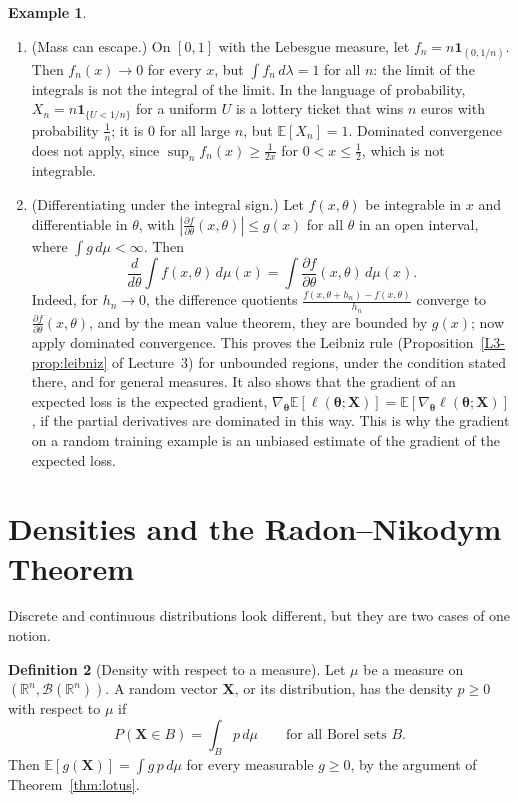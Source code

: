 \documentclass[11pt]{article}
\newcommand{\E}{\mathbb{E}}
\theoremstyle{definition}
\newtheorem{definition}{Definition}[section]
\newtheorem{example}[definition]{Example}
\theoremstyle{plain}
\theoremstyle{remark}
\begin{document}
\begin{example}\label{ex:escaping-mass}
    \begin{enumerate}
        \item (Mass can escape.) On $[0, 1]$ with the Lebesgue measure, let $f_n = n\mathbf{1}_{(0, 1/n)}$. Then $f_n(x) \to 0$ for every $x$, but $\int f_n\, d\lambda = 1$ for all $n$: the limit of the integrals is not the integral of the limit. In the language of probability, $X_n = n\mathbf{1}_{\{U < 1/n\}}$ for a uniform $U$ is a lottery ticket that wins $n$ euros with probability $\frac{1}{n}$; it is $0$ for all large $n$, but $\E[X_n] = 1$. Dominated convergence does not apply, since $\sup_n f_n(x) \geq \frac{1}{2x}$ for $0 < x \leq \frac{1}{2}$, which is not integrable.
        \item (Differentiating under the integral sign.) Let $f(x, \theta)$ be integrable in $x$ and differentiable in $\theta$, with $|\frac{\partial f}{\partial\theta}(x, \theta)| \leq g(x)$ for all $\theta$ in an open interval, where $\int g\, d\mu < \infty$. Then
        \[\frac{d}{d\theta}\int f(x, \theta)\, d\mu(x) = \int \frac{\partial f}{\partial\theta}(x, \theta)\, d\mu(x).\]
        Indeed, for $h_n \to 0$, the difference quotients $\frac{f(x, \theta + h_n) - f(x, \theta)}{h_n}$ converge to $\frac{\partial f}{\partial\theta}(x, \theta)$, and by the mean value theorem, they are bounded by $g(x)$; now apply dominated convergence. This proves the Leibniz rule (Proposition~\ref{L3-prop:leibniz} of Lecture~3) for unbounded regions, under the condition stated there, and for general measures. It also shows that the gradient of an expected loss is the expected gradient, $\nabla_{\boldsymbol{\theta}}\E[\ell(\boldsymbol{\theta}; \mathbf{X})] = \E[\nabla_{\boldsymbol{\theta}}\ell(\boldsymbol{\theta}; \mathbf{X})]$, if the partial derivatives are dominated in this way. This is why the gradient on a random training example is an unbiased estimate of the gradient of the expected loss.
    \end{enumerate}
\end{example}

\section{Densities and the Radon--Nikodym Theorem}\label{sec:densities}

Discrete and continuous distributions look different, but they are two cases of one notion.

\begin{definition}[Density with respect to a measure]\label{def:density}
    Let $\mu$ be a measure on $(\mathbb{R}^n, \mathcal{B}(\mathbb{R}^n))$. A random vector $\mathbf{X}$, or its distribution, has the density $p \geq 0$ with respect to $\mu$ if
    \[P(\mathbf{X} \in B) = \int_B p\, d\mu \qquad \text{for all Borel sets } B.\]
    Then $\E[g(\mathbf{X})] = \int g\,p\, d\mu$ for every measurable $g \geq 0$, by the argument of Theorem~\ref{thm:lotus}.
\end{definition}
\end{document}
